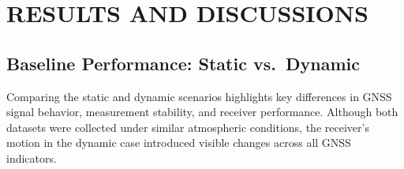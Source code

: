 
\section{RESULTS AND DISCUSSIONS} \label{sec:results}

    \subsection{Baseline Performance: Static vs.\ Dynamic}

        Comparing the static and dynamic scenarios highlights key differences in GNSS signal behavior, measurement stability, and receiver performance. Although both datasets were collected under similar atmospheric conditions, the receiver's motion in the dynamic case introduced visible changes across all GNSS indicators.
    
